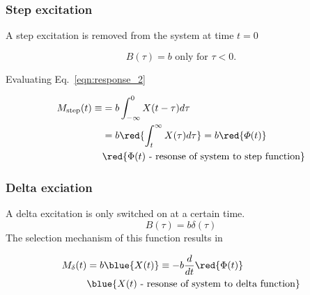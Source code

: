 \newpage \subsubsection{Step  excitation} A step  excitation is removed  from the
system at time $ t = 0 $

  \begin{equation}
    B(\tau) = b \text{ only for } \tau < 0.
  \end{equation}

  \noindent Evaluating Eq.~\eqref{eqn:response_2}

  \begin{framed}\noindent
    \begin{equation}\label{eqn:step_1}
      \begin{aligned}
        M_\text{step}(t)  \equiv& = b\int_{-\infty}^{0}X(t-\tau)d\tau\\
        & = b\red{\int_{t}^{\infty} X(\tau)d\tau} = b \red{\varPhi(t)} \\
        & \red{\Phi(t) \text{ - resonse of system to step function}}
      \end{aligned}
    \end{equation}
  \end{framed}
  \subsubsection{Delta exciation}
  A delta excitation is only switched on at a certain time.
  \begin{equation}
    B(\tau) = b\delta(\tau)
  \end{equation}
  \noindent The selection mechanism of this function results in

  \begin{framed}\noindent
    \begin{equation}\label{eqn:delta}
      \begin{aligned}
        M_\delta(t) & = b\blue{X(t)} \equiv -b\frac{d}{dt}\red{\Phi(t)}\\
        & \blue{X(t) \text{ - resonse of system to delta
            function}} %
      \end{aligned}
    \end{equation}
  \end{framed}

